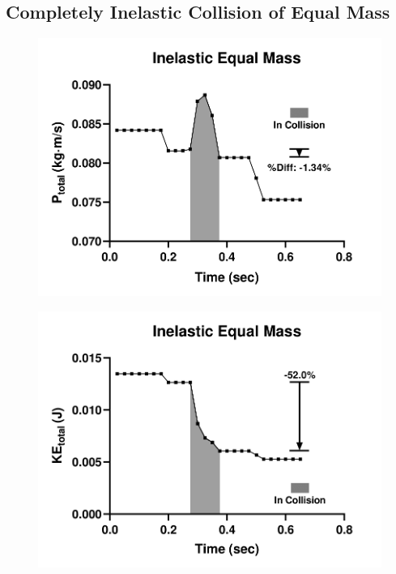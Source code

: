 \subsection{Completely Inelastic Collision of Equal Mass}
\begin{figure}[!htb]
	\centering
	\begin{minipage}{.5\textwidth}
		\centering
		\includegraphics[width=\linewidth]{iep}
		\label{fig:test1}
	\end{minipage}%
	\begin{minipage}{.5\textwidth}
		\centering
		\includegraphics[width=\linewidth]{iek}
		\label{fig:test2}
	\end{minipage}
\end{figure}

